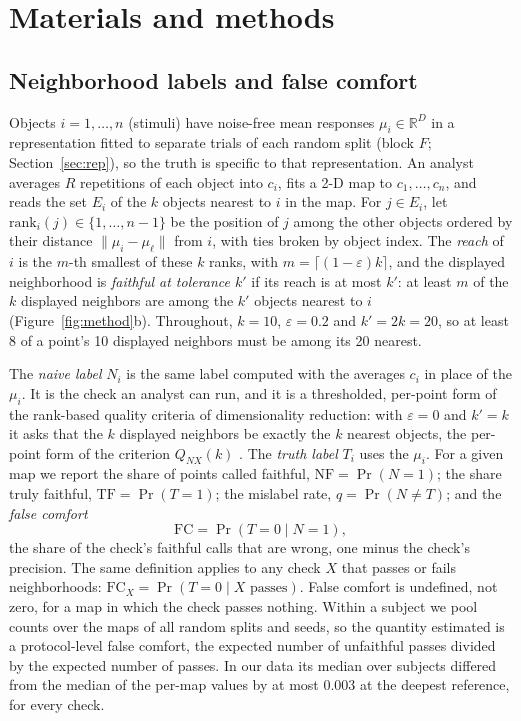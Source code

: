 \documentclass[11pt]{article}
\newcommand{\FC}{\mathrm{FC}}
\newcommand{\PoolDiffMax}{0.003}
\begin{document}
\section{Materials and methods}\label{sec:methods}

\subsection{Neighborhood labels and false comfort}\label{sec:def}

Objects $i=1,\dots,n$ (stimuli) have noise-free mean responses $\mu_i\in\mathbb{R}^D$ in a representation fitted to separate trials of each random split (block $F$; Section~\ref{sec:rep}), so the truth is specific to that representation.
An analyst averages $R$ repetitions of each object into $c_i$, fits a 2-D map to $c_1,\dots,c_n$, and reads the set $E_i$ of the $k$ objects nearest to $i$ in the map.
For $j\in E_i$, let $\mathrm{rank}_i(j)\in\{1,\dots,n-1\}$ be the position of $j$ among the other objects ordered by their distance $\|\mu_i-\mu_\ell\|$ from $i$, with ties broken by object index.
The \emph{reach} of $i$ is the $m$-th smallest of these $k$ ranks, with $m=\lceil(1-\varepsilon)k\rceil$, and the displayed neighborhood is \emph{faithful at tolerance $k'$} if its reach is at most $k'$: at least $m$ of the $k$ displayed neighbors are among the $k'$ objects nearest to $i$ (Figure~\ref{fig:method}b).
Throughout, $k=10$, $\varepsilon=0.2$ and $k'=2k=20$, so at least 8 of a point's 10 displayed neighbors must be among its 20 nearest.

The \emph{naive label} $N_i$ is the same label computed with the averages $c_i$ in place of the $\mu_i$.
It is the check an analyst can run, and it is a thresholded, per-point form of the rank-based quality criteria of dimensionality reduction: with $\varepsilon=0$ and $k'=k$ it asks that the $k$ displayed neighbors be exactly the $k$ nearest objects, the per-point form of the criterion $Q_{NX}(k)$ \citep{lee2009}.
The \emph{truth label} $T_i$ uses the $\mu_i$.
For a given map we report the share of points called faithful, $\mathrm{NF}=\Pr(N=1)$; the share truly faithful, $\mathrm{TF}=\Pr(T=1)$; the mislabel rate, $q=\Pr(N\neq T)$; and the \emph{false comfort}
\begin{equation}
\FC=\Pr(T=0\mid N=1),\label{eq:fc}
\end{equation}
the share of the check's faithful calls that are wrong, one minus the check's precision.
The same definition applies to any check $X$ that passes or fails neighborhoods: $\FC_X=\Pr(T=0\mid X \text{ passes})$.
False comfort is undefined, not zero, for a map in which the check passes nothing.
Within a subject we pool counts over the maps of all random splits and seeds, so the quantity estimated is a protocol-level false comfort, the expected number of unfaithful passes divided by the expected number of passes.
In our data its median over subjects differed from the median of the per-map values by at most \PoolDiffMax{} at the deepest reference, for every check.
\end{document}

